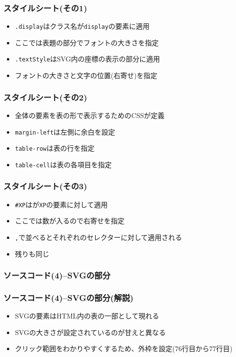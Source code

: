  \begin{frame}[containsverbatim]
  \frametitle{スタイルシート(その1)}
  \begin{itemize}
   \item \texttt{.display}はクラス名が\texttt{display}の要素に適用
   \item ここでは表題の部分でフォントの大きさを指定
   \item \texttt{.textStyle}はSVG内の座標の表示の部分に適用
   \item フォントの大きさと文字の位置(右寄せ)を指定
  \end{itemize}
 \end{frame}
\begin{frame}[containsverbatim]
  \frametitle{スタイルシート(その2)}
 \begin{itemize}
  \item 全体の要素を表の形で表示するためのCSSが定義
  \item \texttt{margin-left}は左側に余白を設定
  \item \texttt{table-row}は表の行を指定
  \item \texttt{table-cell}は表の各項目を指定
 \end{itemize}
\end{frame}
\begin{frame}[containsverbatim]
  \frametitle{スタイルシート(その3)}
 \begin{itemize}
  \item \texttt{\#XP}はが\texttt{XP}の要素に対して適用
  \item ここでは数が入るので右寄せを指定
  \item \texttt{,}で並べるとそれぞれのセレクターに対して適用される
  \item 残りも同じ
 \end{itemize}
\end{frame}
\begin{frame}[containsverbatim]
 \frametitle{ソースコード(4)--SVGの部分}
\end{frame}
\begin{frame}[containsverbatim]
 \frametitle{ソースコード(4)--SVGの部分(解説)}
 \begin{itemize}
  \item SVGの要素はHTML内の表の一部として現れる
  \item SVGの大きさが設定されているのが甘えと異なる
  \item クリック範囲をわかりやすくするため、外枠を設定(76行目から77行目)
 \end{itemize}
\end{frame}
